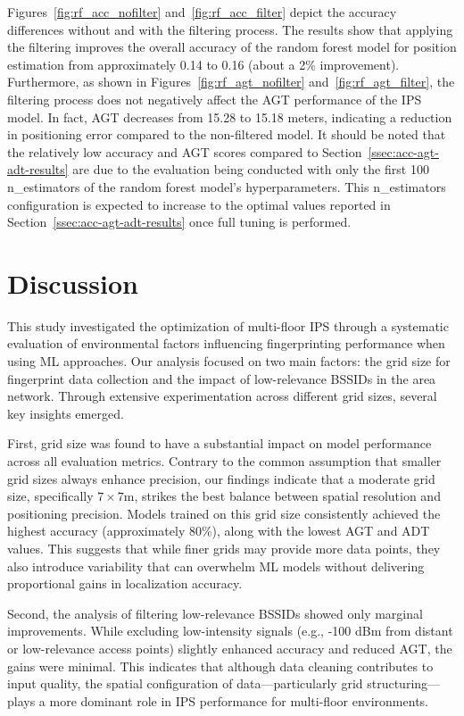 \documentclass[runningheads]{llncs}
\begin{document}
Figures~\ref{fig:rf_acc_nofilter} and~\ref{fig:rf_acc_filter} depict the accuracy differences without and with the filtering process. The results show that applying the filtering improves the overall accuracy of the random forest model for position estimation from approximately 0.14 to 0.16 (about a 2\% improvement). Furthermore, as shown in Figures~\ref{fig:rf_agt_nofilter} and~\ref{fig:rf_agt_filter}, the filtering process does not negatively affect the AGT performance of the IPS model. In fact, AGT decreases from 15.28 to 15.18 meters, indicating a reduction in positioning error compared to the non-filtered model. It should be noted that the relatively low accuracy and AGT scores compared to Section~\ref{ssec:acc-agt-adt-results} are due to the evaluation being conducted with only the first 100 n\_estimators of the random forest model's hyperparameters. This n\_estimators configuration is expected to increase to the optimal values reported in Section~\ref{ssec:acc-agt-adt-results} once full tuning is performed.

\section{Discussion}\label{sec:discussion}

This study investigated the optimization of multi-floor IPS through a systematic evaluation of environmental factors influencing fingerprinting performance when using ML approaches. Our analysis focused on two main factors: the grid size for fingerprint data collection and the impact of low-relevance BSSIDs in the area network. Through extensive experimentation across different grid sizes, several key insights emerged.

First, grid size was found to have a substantial impact on model performance across all evaluation metrics. Contrary to the common assumption that smaller grid sizes always enhance precision, our findings indicate that a moderate grid size, specifically $7\times7$m, strikes the best balance between spatial resolution and positioning precision. Models trained on this grid size consistently achieved the highest accuracy (approximately 80\%), along with the lowest AGT and ADT values. This suggests that while finer grids may provide more data points, they also introduce variability that can overwhelm ML models without delivering proportional gains in localization accuracy.

Second, the analysis of filtering low-relevance BSSIDs showed only marginal improvements. While excluding low-intensity signals (e.g., -100 dBm from distant or low-relevance access points) slightly enhanced accuracy and reduced AGT, the gains were minimal. This indicates that although data cleaning contributes to input quality, the spatial configuration of data—particularly grid structuring—plays a more dominant role in IPS performance for multi-floor environments.
\end{document}
